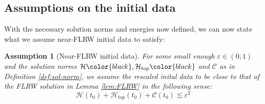 \documentclass[11pt,leqno,textwidth=10cm]{amsart}
\numberwithin{equation}{section}
\theoremstyle{definition}
\theoremstyle{plain}
\newtheorem{assumption}[definition]{Assumption}
\newcommand{\1}{\mathbbm{1}}
\newcommand{\E}{\mathcal{E}}
\newcommand{\Ric}{\text{\normalfont{Ric}}}
\renewcommand{\epsilon}{\varepsilon}
\newcommand{\Lap}{\Delta}
\newcommand{\numberthis}{\addtocounter{equation}{1}\tag{\theequation}}
\renewcommand{\theequation}{\arabic{section}.\arabic{equation}}
\newcommand{\change}[1]{\color{black}#1\color{black}}
\newcommand{\delete}[1]{}
\begin{document}
\subsection{Assumptions on the initial data}\label{subsec:init}

With the necessary solution norms and energies now defined, we can now state what we assume near-FLRW initial data to satisfy:

\begin{assumption}[Near-FLRW initial data]\label{ass:init}
For some small enough $\epsilon\in(0,1)$ and the solution norms $\mathcal{H}\change{, \mathcal{H}_{top}}$ and $\mathcal{C}$ as in Definition \ref{def:sol-norm}, we assume the rescaled inital data to be close to that of the FLRW solution in Lemma \ref{lem:FLRW} in the following sense:
\begin{equation}\label{eq:init-ass}
\mathcal{H}(t_0)+\mathcal{H}_{top}(t_0)+\mathcal{C}(t_0)\lesssim\epsilon^2
\end{equation}
\delete{Additionally [...]} %
\end{assumption}
\end{document}
